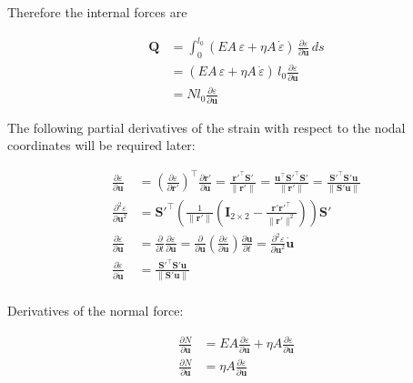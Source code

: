 Therefore the internal forces are

\begin{align}
\boldsymbol{Q} &= \int_{0}^{l_{0}} \left( EA\,\varepsilon + \eta A\,\dot{\varepsilon} \right)\,\frac{\partial \varepsilon}{\partial \boldsymbol{u}}\,ds \\
&= \left( EA\,\varepsilon + \eta A\,\dot{\varepsilon} \right)\,l_{0}\frac{\partial \varepsilon}{\partial \boldsymbol{u}} \\
&= Nl_{0}\frac{\partial \varepsilon}{\partial \boldsymbol{u}}
\end{align}

The following partial derivatives of the strain with respect to the nodal coordinates will be required later:

\begin{align}
\frac{\partial \varepsilon}{\partial \boldsymbol{u}} &= \left(\frac{\partial \varepsilon}{\partial \boldsymbol{r}'}\right)^\intercal\frac{\partial \boldsymbol{r}'}{\partial \boldsymbol{u}} = \frac{\boldsymbol{r}'^\intercal\boldsymbol{S}'}{\lVert \boldsymbol{r}' \rVert} = \frac{\boldsymbol{u}^\intercal\boldsymbol{S}'^\intercal\boldsymbol{S}'}{\lVert \boldsymbol{r}' \rVert} = \frac{\boldsymbol{S}'^\intercal\boldsymbol{S}'\boldsymbol{u}}{\lVert \boldsymbol{S}'\boldsymbol{u} \rVert} \\
\frac{\partial^2 \varepsilon}{\partial \boldsymbol{u}^2} &= \boldsymbol{S}'^\intercal\left(\frac{1}{\lVert\boldsymbol{r}'\rVert}\left(\boldsymbol{I}_{2 \times 2} - \frac{\boldsymbol{r}'\boldsymbol{r}'^\intercal}{\lVert\boldsymbol{r}'\rVert^2}\right) \right)\boldsymbol{S}' \\
\frac{\partial \dot{\varepsilon}}{\partial \boldsymbol{u}} &= \frac{\partial}{\partial t}\frac{\partial \varepsilon}{\partial \boldsymbol{u}} = \frac{\partial}{\partial \boldsymbol{u}}\left( \frac{\partial \varepsilon}{\partial \boldsymbol{u}} \right)\frac{\partial\boldsymbol{u}}{\partial t} = \frac{\partial^2 \varepsilon}{\partial \boldsymbol{u}^2}\dot{\boldsymbol{u}} \\
\frac{\partial \dot{\varepsilon}}{\partial \dot{\boldsymbol{u}}} &= \frac{\boldsymbol{S}'^\intercal\boldsymbol{S}'\boldsymbol{u}}{\lVert \boldsymbol{S}'\boldsymbol{u} \rVert} \\
\end{align}

Derivatives of the normal force:

\begin{align}
\frac{\partial N}{\partial \boldsymbol{u}} &= EA\frac{\partial \varepsilon}{\partial \boldsymbol{u}} + \eta A\frac{\partial \dot{\varepsilon}}{\partial \boldsymbol{u}} \\
\frac{\partial N}{\partial \dot{\boldsymbol{u}}} &= \eta A\frac{\partial \dot{\varepsilon}}{\partial \dot{\boldsymbol{u}}}
\end{align}


